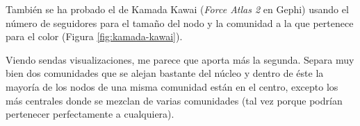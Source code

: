 También se ha probado el de Kamada Kawai (\textit{Force Atlas 2} en Gephi) usando el número de seguidores para el tamaño del nodo y la comunidad a la que pertenece para el color (Figura \ref{fig:kamada-kawai}).

\bigskip
Viendo sendas visualizaciones, me parece que aporta más la segunda. Separa muy bien dos comunidades que se alejan bastante del núcleo y dentro de éste la mayoría de los nodos de una misma comunidad están en el centro, excepto los más centrales donde se mezclan de varias comunidades (tal vez porque podrían pertenecer perfectamente a cualquiera).
